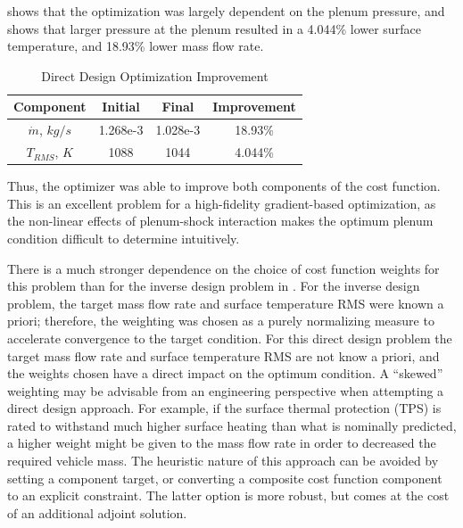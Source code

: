  shows that the optimization was largely dependent on the
plenum pressure, and  shows that larger pressure at
the plenum resulted in a 4.044\% lower surface temperature, and 18.93\% lower
mass flow rate.
\begin{table}[h]
  \centering
  \begin{tabular}{c|c|c|c}
    Component & Initial & Final & Improvement\\
    \hline
    $\dot{m}$, $kg/s$ & 1.268e-3 & 1.028e-3 & 18.93\% \\
    $T_{RMS}$, $K$    & 1088     & 1044     & 4.044\%
  \end{tabular}
  \caption{Direct Design Optimization Improvement}
  \label{tab:design-improvement}
\end{table}
Thus, the optimizer was able to improve both components of the cost function.
This is an excellent problem for a high-fidelity gradient-based
optimization, as the non-linear effects of plenum-shock interaction makes the
optimum plenum condition difficult to determine intuitively.

There is a much stronger dependence on the choice of cost function weights for
this problem than for the inverse design problem in .  For
the inverse design problem, the target mass flow rate and surface temperature
RMS were known a priori; therefore, the weighting was chosen as a purely
normalizing measure to accelerate convergence to the target condition.  For this
direct design problem the target mass flow rate and surface temperature RMS are
not know a priori, and the weights chosen have a direct impact on the optimum
condition.  A ``skewed'' weighting may be advisable from an engineering
perspective when attempting a direct design approach.  For example, if the
surface thermal protection (TPS) is rated to withstand much higher surface
heating than what is nominally predicted, a higher weight might be given to the
mass flow rate in order to decreased the required vehicle mass.  The heuristic
nature of this approach can be avoided by setting a component target, or
converting a composite cost function component to an explicit constraint.  The
latter option is more robust, but comes at the cost of an additional adjoint
solution.
